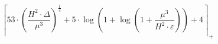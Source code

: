 \[\left\lceil 53 \cdot \left(\frac{H^{2} \cdot \Delta}{\mu^{3}}\right)^{\frac{1}{4}} + 5 \cdot \log\left(1 + \log\left(1 + \frac{\mu^{3}}{H^{2} \cdot \varepsilon}\right)\right) + 4 \right\rceil_{+}\]
